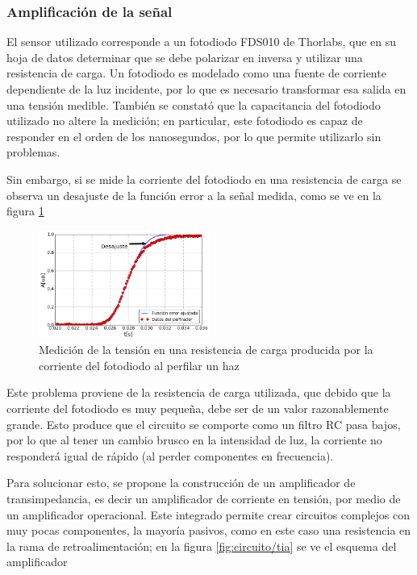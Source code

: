 \subsubsection{Amplificación de la señal}

El sensor utilizado corresponde a un fotodiodo  FDS010\cite{fds010} de Thorlabs, que en su hoja de datos determinar que se debe polarizar en inversa y utilizar una resistencia de carga. Un fotodiodo es modelado como una fuente de corriente dependiente de la luz incidente, por lo que es necesario transformar esa salida en una tensión medible. También se constató que la capacitancia del fotodiodo utilizado no altere la medición; en particular, este fotodiodo es capaz de responder en el orden de los nanosegundos, por lo que permite utilizarlo sin problemas.

Sin embargo, si se mide la corriente del fotodiodo en una resistencia de carga se observa un desajuste de la función error a la señal medida, como se ve en la figura \ref{fig:circuito/desajuste}

\begin{figure}[H]
    \centering
    \includegraphics[width=0.5\textwidth]{fig/perfilador/labo6/fit_data_labo6_anotado}
    \caption{Medición de la tensión en una resistencia de carga producida por la corriente del fotodiodo al perfilar un haz}
    \label{fig:circuito/desajuste}
\end{figure}

Este problema proviene de la resistencia de carga utilizada, que debido que la corriente del fotodiodo es muy pequeña, debe ser de un valor razonablemente grande. Esto produce que el circuito se comporte como un filtro RC pasa bajos, por lo que al tener un cambio brusco en la intensidad de luz, la corriente no responderá igual de rápido (al perder componentes en frecuencia). 

Para solucionar esto, se propone la construcción de un amplificador de transimpedancia, es decir un amplificador de corriente en tensión, por medio de un amplificador operacional. Este integrado permite crear circuitos complejos con muy pocas componentes, la mayoría pasivos, como en este caso una resistencia en la rama de retroalimentación; en la figura \ref{fig:circuito/tia} se ve el esquema del amplificador

